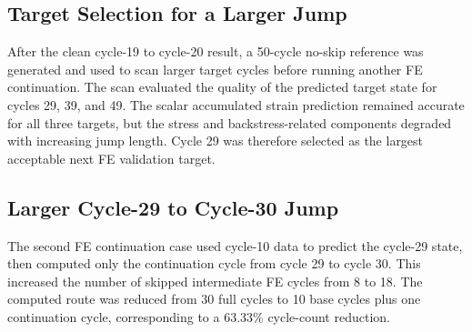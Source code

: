 \subsection{Target Selection for a Larger Jump}

After the clean cycle-19 to cycle-20 result, a 50-cycle no-skip reference was generated and used to scan larger target cycles before running another FE continuation. The scan evaluated the quality of the predicted target state for cycles 29, 39, and 49. The scalar accumulated strain prediction remained accurate for all three targets, but the stress and backstress-related components degraded with increasing jump length. Cycle 29 was therefore selected as the largest acceptable next FE validation target.

\begin{table}[htbp]
\centering
\small
{}
\caption{Stage 6C multi-target prediction scan. The scan used the existing 50-cycle no-skip reference and no additional Abaqus continuation runs.}
\label{tab:stage6c_multitarget_scan}
\end{table}

\subsection{Larger Cycle-29 to Cycle-30 Jump}

The second FE continuation case used cycle-10 data to predict the cycle-29 state, then computed only the continuation cycle from cycle 29 to cycle 30. This increased the number of skipped intermediate FE cycles from 8 to 18. The computed route was reduced from 30 full cycles to 10 base cycles plus one continuation cycle, corresponding to a 63.33\% cycle-count reduction.

